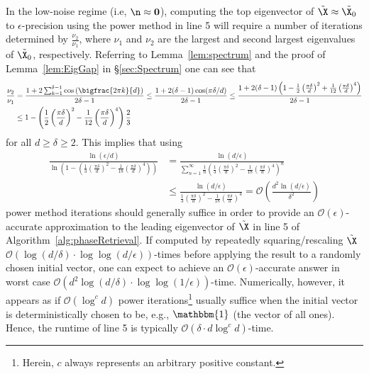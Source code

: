 In the low-noise regime (i.e, $\n \approx {\bf 0}$), computing the top eigenvector of $\tilde{\X} \approx \tilde{\X_0}$ to $\epsilon$-precision using the power method in line 5 will require a number of iterations determined by $\frac{\nu_2}{\nu_1}$, where $\nu_1$ and $\nu_2$ are the largest and second largest eigenvalues of $\tilde{\X_0}$, respectively.  Referring to Lemma~\ref{lem:spectrum} and the proof of Lemma~\ref{lem:EigGap} in \S \ref{sec:Spectrum} one can see that
\begin{align*}
\frac{\nu_2}{\nu_1} &= \frac{1 + 2 \sum_{k = 1}^{\delta - 1}\cos\left(\bigfrac{2\pi k}{d}\right)}{2 \delta - 1} \leq \frac{1 + 2 (\delta - 1) \cos (\pi \delta / d)}{2 \delta - 1} \leq  \frac{1 + 2 (\delta - 1) \left(1 - \frac{1}{2} \left(\frac{\pi \delta}{d} \right)^2 + \frac{1}{12} \left(\frac{\pi \delta}{d} \right)^4 \right)}{2 \delta - 1}\\
& \leq 1 - \left(\frac{1}{2} \left(\frac{\pi \delta}{d} \right)^2 - \frac{1}{12} \left(\frac{\pi \delta}{d} \right)^4 \right)\frac{2}{3}
\end{align*}
for all $d \geq \delta \geq 2$.  This implies that using
\begin{align*}
\frac{\ln(\epsilon/d)}{\ln \left(1 - \left(\frac{1}{3} \left(\frac{\pi \delta}{d} \right)^2 - \frac{1}{18} \left(\frac{\pi \delta}{d} \right)^4 \right) \right)} &= \frac{\ln(d/ \epsilon)}{ \sum^{\infty}_{n=1} \frac{1}{n} \left(\frac{1}{3} \left(\frac{\pi \delta}{d} \right)^2 - \frac{1}{18} \left(\frac{\pi \delta}{d} \right)^4 \right)^n}\\ 
&\leq \frac{\ln(d/ \epsilon)}{ \frac{1}{3} \left(\frac{\pi \delta}{d} \right)^2 - \frac{1}{18} \left(\frac{\pi \delta}{d} \right)^4 } = \mathcal{O}\left( \frac{d^2 \ln (d/\epsilon)}{\delta^2} \right)
\end{align*}
power method iterations should generally suffice in order to provide an $\mathcal{O}(\epsilon)$-accurate approximation to the leading eigenvector of $\tilde{\X}$ in line 5 of Algorithm~\ref{alg:phaseRetrieval}.
If computed by repeatedly squaring/rescaling $\tilde{\X}$ $\mathcal{O} \left(\log (d/\delta) \cdot \log \log (d/\epsilon)  \right)$-times before applying the result to a randomly chosen initial vector, one can expect to achieve an $\mathcal{O}(\epsilon)$-accurate answer in worst case $\mathcal{O}(d^2 \log (d/\delta) \cdot \log \log (1/\epsilon) )$-time.  Numerically, however, it appears as if $\mathcal{O}(\log^c d)$ power iterations\footnote{Herein, $c$ always represents an arbitrary positive constant.} usually suffice when the initial vector is deterministically chosen to be, e.g., $\mathbbm{1}$ (the vector of all ones).  Hence, the runtime of line 5 is typically $\mathcal{O}(\delta \cdot d \log^c d )$-time.  

